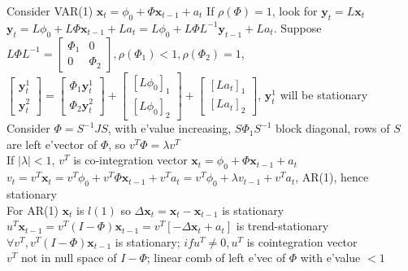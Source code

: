 \documentclass[10pt,landscape, a4paper]{article}
\theoremstyle{remark}
\newcommand{\abs}[1]{\left\lvert #1 \right\rvert}
\begin{document}
\begin{multicols*}{3}
Consider VAR(1) $\bm{x}_t = \phi_0 + \Phi \bm{x}_{t-1} + a_t$ If $\rho (\Phi) = 1$, look for $\bm{y}_t = L\bm{x}_t$\\
$\bm{y}_t = L\phi_0 + L\Phi \bm{x}_{t-1} +La_t = L\phi_0 + L\Phi L^{-1} \bm{y}_{t-1} +La_t $. Suppose $L\Phi L^{-1} = \begin{bmatrix}
    \Phi_1 &0 \\ 0 &\Phi_2
\end{bmatrix}, \rho (\Phi_1) < 1, \rho(\Phi_2) = 1$,
$\begin{bmatrix}\bm{y}^1_t\\\bm{y}^2_t \end{bmatrix} = \begin{bmatrix}\Phi_1 \bm{y}^1_t\\\Phi_2 \bm{y}^2_t \end{bmatrix} + \begin{bmatrix}
    [L\phi_0]_1 \\ [L\phi_0]_2
\end{bmatrix} + \begin{bmatrix}
    [La_t]_1 \\ [La_t]_2
\end{bmatrix}$, $\bm{y}^1_t$ will be stationary\\
Consider $\Phi = S^{-1} J S$, with e'value increasing, $S\Phi_1 S^{-1}$ block diagonal, rows of $S$ are left e'vector of $\Phi$, so $v^T \Phi = \lambda v^T$\\
If $\abs{\lambda} < 1$, $v^T$ is co-integration vector $\bm{x}_t = \phi_0 + \Phi \bm{x}_{t-1} + a_t $\\
$v_t = v^T \bm{x}_t =v^T \phi_0 + v^T \Phi \bm{x}_{t-1} + v^T a_t = v^T \phi_0 + \lambda v_{t-1} + v^T a_t $, AR(1), hence stationary\\

For AR(1) $\bm{x}_t$ is $l(1)$ so $\Delta \bm{x}_t = \bm{x}_t - \bm{x}_{t-1}$ is stationary\\
$u^T \bm{x}_{t-1} = v^T (I-\Phi )\bm{x}_{t-1} = v^T [-\Delta \bm{x}_t + a_t]$ is trend-stationary\\
$\forall v^T, v^T (I-\Phi )\bm{x}_{t-1}$ is stationary; $if u^T \neq 0, u^T$ is cointegration vector\\
$v^T$ not in null space of $I-\Phi$; linear comb of left e'vec of $\Phi$ with e'value $<1$\\


\end{multicols*}
\end{document}
